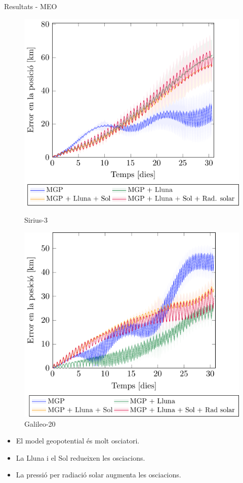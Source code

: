 \documentclass{beamer} %
\begin{document}
\begin{frame}{Resultats - MEO}
  \begin{figure}[ht]
    \centering
    \begin{minipage}[ht]{0.45\textwidth}
      \centering
      \includegraphics[width=\textwidth]{../Images/simulation/SIRIUS_ca.pdf}
      \caption{Sirius-3}
    \end{minipage}
    \hspace{0.0333333\textwidth}
    \begin{minipage}[ht]{0.45\textwidth}
      \centering
      \includegraphics[width=\textwidth]{../Images/simulation/GALILEO_ca.pdf}
      \caption{Galileo-20}
    \end{minipage}
  \end{figure}
  \begin{itemize}
    \item El model geopotential és molt osci\lgem atori.
    \item La Lluna i el Sol redueixen les osci\lgem acions.
    \item La pressió per radiació solar augmenta les osci\lgem acions.
  \end{itemize}
\end{frame}
\end{document}
